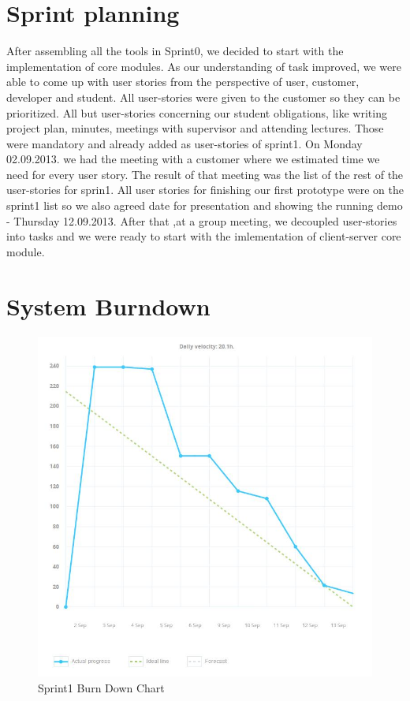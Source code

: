\section{Sprint planning}
After assembling all the tools in Sprint0, we decided to start with the implementation of core modules.
As our understanding of task improved, we were able to come up with user stories from the perspective of user, customer, developer and student.
All user-stories were given to the customer so they can be prioritized. 
All but user-stories concerning our student obligations, like writing project plan, minutes, meetings with supervisor and attending lectures.
Those were mandatory and already added as user-stories of sprint1.
On Monday 02.09.2013. we had the meeting with a customer where we estimated time we need for every user story.
The result of that meeting was the list of the rest of the user-stories for sprin1.
All user stories for finishing our first prototype were on the sprint1 list so we also agreed date for presentation and showing the running demo - Thursday 12.09.2013. 
After that ,at a group meeting, we decoupled user-stories into tasks and we were ready to start with the imlementation of client-server core module.



\section{System Burndown}

\begin{figure}[!t]
	\centering
		\includegraphics[width=16cm]{burn_down_chart.jpg}
	\caption{Sprint1 Burn Down Chart}
	\label{fig:sprint1_burn_down_chart}
\end{figure}

